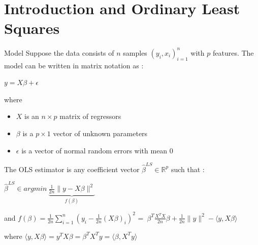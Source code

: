 \documentclass[unknownkeysallowed]{beamer}
\begin{document}




\section{Introduction and Ordinary Least Squares}
\label{sec:introdcution}


\begin{frame}
\begin{alertblock}{Model}
Suppose the data consists of $n$ samples $( y_i, x_i )^n_{i=1}$ with $p$ features.
\newline The model can be written in matrix notation as :
\begin{center}
$y=X\beta+\epsilon$
\end{center}
where
\begin{itemize}
	\item $X$ is an $n \times p$ matrix of regressors
	\item $\beta$ is a $p \times 1$ vector of unknown parameters
	\item $\epsilon$ is a vector of normal random errors with mean $0$
\end{itemize}
\end{alertblock}
\end{frame}


\begin{frame}
The OLS estimator is any coefficient vector
$\hat\beta^{LS}\in\mathbb{R}^p$ such that :
\newline
\begin{center}
$\hat\beta^{LS} \in argmin \ \underbrace{\frac{1}{2n}\|y-X\beta\|^2 }_{f(\beta)}$
\end{center}
\vspace{0.5cm}
and $f(\beta)=\frac{1}{2n}\sum\limits_{i=1}^n (y_{i}-\frac{1}{2n}(X\beta)_{i})^2$ =\ $\beta^T\frac{X^TX}{2n}\beta+\frac{1}{2n}\|y\|^2- \langle y,X\beta\rangle$

\vspace{0.5cm}
where
$\langle y,X\beta\rangle=y^TX\beta=\beta^TX^Ty=\langle \beta,X^Ty\rangle$
\end{frame}
\end{document}
